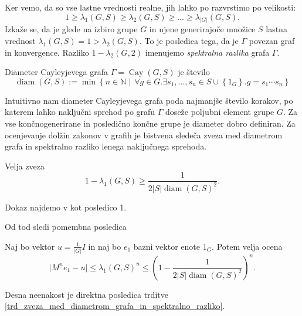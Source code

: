 Ker vemo, da so vse lastne vrednosti realne, jih lahko po razvrstimo po velikosti: 
\begin{equation*}
1 \ge \lambda_1(G, S) \ge \lambda_2(G, S) \ge \ldots \ge \lambda_{\lvert G \rvert }(G, S).  
\end{equation*}  
Izkaže se, da je glede na izbiro grupe $G$ in njene generirajoče množice $S$ lastna vrednost $\lambda_1(G, S) = 1 > \lambda_2(G, S)$. To je posledica tega, da je $\Gamma$ povezan graf in konvergence. %
Razliko $1 - \lambda_2(G, 2)$ imenujemo \emph{spektralna razlika} grafa $\Gamma$. 

\begin{definicija}
\label{def_diameter_cayleyjevega_grafa}
Diameter Cayleyjevega grafa $\Gamma = \operatorname{Cay}(G, S)$ je število \begin{equation*}
    \operatorname{diam}(G, S) := \min \left\{ n \in \mathbb{N}  \middle|\, \forall g \in G. \exists s_1, \ldots , s_n \in S \cup \left\{ 1_G \right\} . g = s_1 \cdots s_n \right\} 
\end{equation*}  
\end{definicija}
Intuitivno nam diameter Cayleyjevega grafa poda najmanjše število korakov, po katerem lahko naključni sprehod po grafu $\Gamma$ doseže poljubni element grupe $G$. Za vse končnogenerirane in posledično končne grupe je diameter dobro definiran.
Za ocenjevanje dolžin zakonov v grafih je bistvena sledeča zveza med diametrom grafa in spektralno razliko lenega naključnega sprehoda.

\begin{trditev}
\label{trd_zveza_med_diametrom_grafa_in_spektralno_razliko}
 Velja zveza \begin{equation*}
 1 - \lambda_1(G, S) \ge \frac{1}{2 \lvert S \rvert \operatorname{diam}(G, S)^2}.
 \end{equation*}  
\end{trditev}
\begin{dokaz}
Dokaz najdemo v \cite{Diaconis_1993} kot posledico 1.  %
\end{dokaz}

Od tod sledi pomembna posledica \begin{posledica}
\label{psl_posledica_zveze_diameter}
Naj bo vektor $u = \frac{1}{\lvert G \rvert} I$ in naj bo $e_1$ bazni vektor enote $1_G$. Potem velja ocena \begin{equation*}
\lvert M^{n} e_1 - u \rvert \le \lambda_1(G, S)^{n} \le \left( 1 - \frac{1}{2 \lvert S \rvert \operatorname{diam}(G, S)^2 } \right)^{n}. 
\end{equation*}    
\end{posledica}
\begin{dokaz}
Desna neenakost je direktna posledica trditve \ref{trd_zveza_med_diametrom_grafa_in_spektralno_razliko}. %
\end{dokaz}

